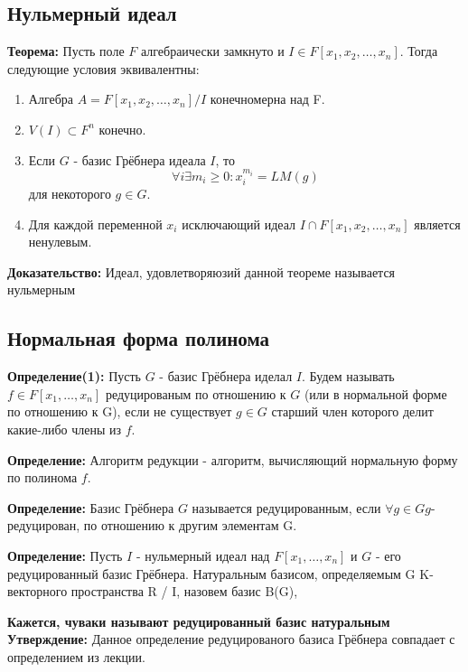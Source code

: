 \documentclass{article}
\begin{document}
    \newpage
    \subsection{Нульмерный идеал}

    \textbf{Теорема:} Пусть поле $F$ алгебраически замкнуто и $I\in F[x_1, x_2,\ldots, x_n]$.
       Тогда следующие условия эквивалентны:
        
        \begin{enumerate}
            \item Алгебра $A=F[x_1, x_2,\ldots, x_n]/I$ конечномерна над F.
            \item $V(I) \subset F^n$ конечно.
            \item Если $G$ - базис Грёбнера идеала $I$, то $$\forall i \exists m_i \geq 0 : x_i^{m_i} = LM(g)$$ для некоторого $g \in G$.
            \item Для каждой переменной $x_i$ исключающий идеал $I \cap F[x_1, x_2,\ldots, x_n]$ является ненулевым.
        \end{enumerate}

        \textbf{Доказательство:}
      Идеал, удовлетворяюзий данной теореме называется нульмерным

    \newpage

    \subsection{Нормальная форма полинома}

    
    \textbf{Определение(1):} Пусть $G$ - базис Грёбнера иделал $I$.
    Будем называть $f \in F[x_1,\ldots,x_n]$ редуцированым по отношению к $G$ (или в нормальной форме по отношению к G), если 
    не существует $g \in G$ старший член которого делит какие-либо члены из $f$.
    
    \textbf{Определение:} Алгоритм редукции - алгоритм, вычисляющий нормальную форму по полинома $f$.
    
    \textbf{Определение:} Базис Грёбнера $G$ называется редуцированным, если $\forall g \in G g$- редуцирован, по отношению к другим элементам G.
    
    \textbf{Определение:} Пусть $I$ - нульмерный идеал над $F[x_1,\ldots,x_n]$ и $G$ - его редуцированный базис Грёбнера.
    Натуральным базисом, определяемым G K-векторного пространства R / I, назовем базис B(G),
    
    \textbf{Кажется, чуваки называют редуцированный базис натуральным}    
    \textbf{Утверждение:} Данное определение редуцированого базиса Грёбнера совпадает с определением из лекции.  
\end{document}
